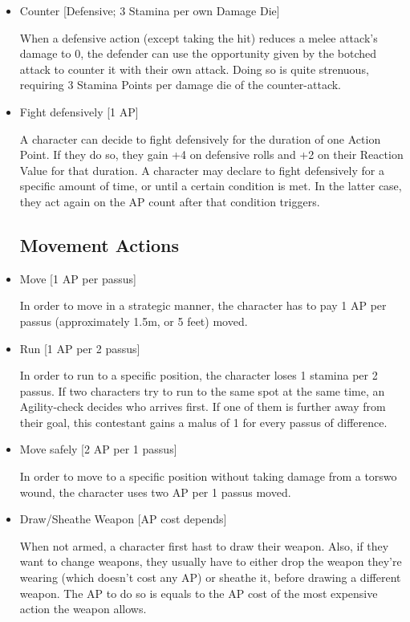 \begin{itemize}
\item Counter [Defensive; 3 Stamina per own Damage Die]

When a defensive action (except taking the hit) reduces a melee attack's damage to 0, the defender can use the opportunity given by the botched attack to counter it with their own attack. Doing so is quite strenuous, requiring 3 Stamina Points per damage die of the counter-attack.



\item Fight defensively [1 AP]

A character can decide to fight defensively for the duration of one Action Point. If they do so, they gain +4 on defensive rolls and +2 on their Reaction Value for that duration. A character may declare to fight defensively for a specific amount of time, or until a certain condition is met. In the latter case, they act again on the AP count after that condition triggers.


\subsection{Movement Actions}

\item Move [1 AP per passus]

In order to move in a strategic manner, the character has to pay 1 AP per passus (approximately 1.5m, or 5 feet) moved. 



\item Run [1 AP per 2 passus]

In order to run to a specific position, the character loses 1 stamina per 2 passus. If two characters try to run to the same spot at the same time, an Agility-check decides who arrives first. If one of them is further away from their goal, this contestant gains a malus of 1 for every passus of difference.



\item Move safely [2 AP per 1 passus]

In order to move to a specific position without taking damage from a torswo wound, the character uses two AP per 1 passus moved.


\item Draw/Sheathe Weapon  [AP cost depends]

When not armed, a character first hast to draw their weapon. Also, if they want to change weapons, they usually have to either drop the weapon they're wearing (which doesn't cost any AP) or sheathe it, before drawing a different weapon. The AP to do so is equals to the AP cost of the most expensive action the weapon allows.


\end{itemize}

